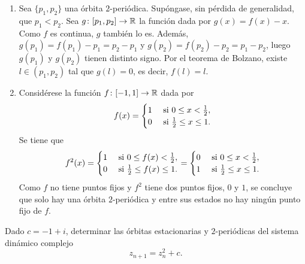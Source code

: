 \documentclass[11pt]{report}
\begin{document}
\begin{solution}
    \hfill
    \begin{enumerate}
        \item Sea $\{p_1,p_2\}$ una órbita $2$-periódica. Supóngase, sin pérdida de generalidad, que $p_1 < p_2$. Sea $g \colon [p_1,p_2] \to \mathbb R$ la función dada por $g(x) = f(x)-x$. Como $f$ es continua, $g$ también lo es. Además, $g(p_1) = f(p_1)-p_1 = p_2-p_1$ y $g(p_2) = f(p_2)-p_2 = p_1-p_2$, luego $g(p_1)$ y $g(p_2)$ tienen distinto signo. Por el teorema de Bolzano, existe $l \in (p_1,p_2)$ tal que $g(l) = 0$, es decir, $f(l) = l$.
        \item Considérese la función $f \colon [-1,1] \to \mathbb R$ dada por
        \[f(x) = \begin{cases}
            1 & $ si $ 0 \leq x < \frac{1}{2}, \\
            0 & $ si $ \frac{1}{2} \leq x \leq 1.
        \end{cases}\]
        Se tiene que
        \[f^2(x) = \begin{cases}
            1 & $ si $ 0 \leq f(x) < \frac{1}{2}, \\
            0 & $ si $ \frac{1}{2} \leq f(x) \leq 1.
        \end{cases} = \begin{cases}
            0 & $ si $ 0 \leq x < \frac{1}{2}, \\
            1 & $ si $ \frac{1}{2} \leq x \leq 1.
        \end{cases}\]
        Como $f$ no tiene puntos fijos y $f^2$ tiene dos puntos fijos, $0$ y $1$, se concluye que solo hay una órbita $2$-periódica y entre sus estados no hay ningún punto fijo de $f$.
    \end{enumerate}
\end{solution}

\begin{exercise}
    Dado $c = -1+i$, determinar las órbitas estacionarias y $2$-periódicas del sistema dinámico complejo
    \[z_{n+1} = z_n^2 + c.\]
\end{exercise}
\end{document}
